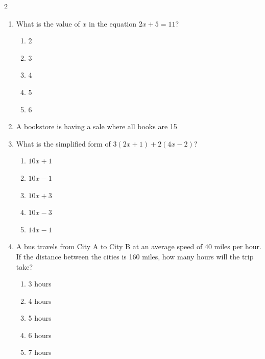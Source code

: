 \documentclass[10pt]{article}
\begin{document}
\begin{multicols}{2}
\begin{enumerate}[label=\textbf{Q\arabic*.}, leftmargin=*, itemsep=6pt, parsep=0pt]
  \item \small What is the value of $x$ in the equation $2x + 5 = 11$?
  \begin{enumerate}[label=(\Alph*), leftmargin=0.6cm, nosep, itemsep=2pt]
    \item 2
    \item 3
    \item 4
    \item 5
    \item 6
  \end{enumerate}

  \item \small A bookstore is having a sale where all books are 15%

  \item \small What is the simplified form of $3(2x + 1) + 2(4x - 2)$?
  \begin{enumerate}[label=(\Alph*), leftmargin=0.6cm, nosep, itemsep=2pt]
    \item $10x + 1$
    \item $10x - 1$
    \item $10x + 3$
    \item $10x - 3$
    \item $14x - 1$
  \end{enumerate}

  \item \small A bus travels from City A to City B at an average speed of 40 miles per hour. If the distance between the cities is 160 miles, how many hours will the trip take?
  \begin{enumerate}[label=(\Alph*), leftmargin=0.6cm, nosep, itemsep=2pt]
    \item 3 hours
    \item 4 hours
    \item 5 hours
    \item 6 hours
    \item 7 hours
  \end{enumerate}


\end{enumerate}
\end{multicols}
\end{document}
